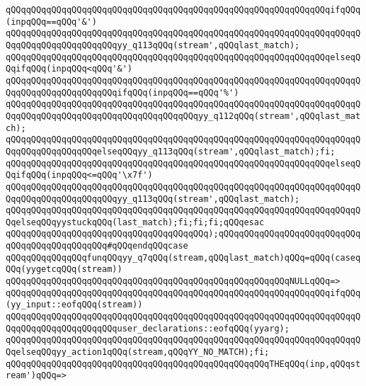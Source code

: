 \verb|qQQqqQQqqQQqqQQqqQQqqQQqqQQqqQQqqQQqqQQqqQQqqQQqqQQqqQQqqQQqqQQqifqQQq(inpqQQq==qQQq'&')|\newline
\verb|qQQqqQQqqQQqqQQqqQQqqQQqqQQqqQQqqQQqqQQqqQQqqQQqqQQqqQQqqQQqqQQqqQQqqQQqqQQqqQQqqQQqqQQqqQQqyy_q113qQQq(stream',qQQqlast_match);|\newline
\verb|qQQqqQQqqQQqqQQqqQQqqQQqqQQqqQQqqQQqqQQqqQQqqQQqqQQqqQQqqQQqqQQqelseqQQqifqQQq(inpqQQq<qQQq'&')|\newline
\verb|qQQqqQQqqQQqqQQqqQQqqQQqqQQqqQQqqQQqqQQqqQQqqQQqqQQqqQQqqQQqqQQqqQQqqQQqqQQqqQQqqQQqqQQqqQQqifqQQq(inpqQQq==qQQq'%')|\newline
\verb|qQQqqQQqqQQqqQQqqQQqqQQqqQQqqQQqqQQqqQQqqQQqqQQqqQQqqQQqqQQqqQQqqQQqqQQqqQQqqQQqqQQqqQQqqQQqqQQqqQQqqQQqqQQqyy_q112qQQq(stream',qQQqlast_match);|\newline
\verb|qQQqqQQqqQQqqQQqqQQqqQQqqQQqqQQqqQQqqQQqqQQqqQQqqQQqqQQqqQQqqQQqqQQqqQQqqQQqqQQqqQQqqQQqelseqQQqyy_q113qQQq(stream',qQQqlast_match);fi;|\newline
\verb|qQQqqQQqqQQqqQQqqQQqqQQqqQQqqQQqqQQqqQQqqQQqqQQqqQQqqQQqqQQqqQQqelseqQQqifqQQq(inpqQQq<=qQQq'\x7f')|\newline
\verb|qQQqqQQqqQQqqQQqqQQqqQQqqQQqqQQqqQQqqQQqqQQqqQQqqQQqqQQqqQQqqQQqqQQqqQQqqQQqqQQqqQQqqQQqqQQqyy_q113qQQq(stream',qQQqlast_match);|\newline
\verb|qQQqqQQqqQQqqQQqqQQqqQQqqQQqqQQqqQQqqQQqqQQqqQQqqQQqqQQqqQQqqQQqqQQqqQQqelseqQQqyystuckqQQq(last_match);fi;fi;fi;qQQqesac|\newline
\verb|qQQqqQQqqQQqqQQqqQQqqQQqqQQqqQQqqQQqqQQq);qQQqqQQqqQQqqQQqqQQqqQQqqQQqqQQqqQQqqQQqqQQqqQQq#qQQqendqQQqcase|\newline
\verb|qQQqqQQqqQQqqQQqfunqQQqyy_q7qQQq(stream,qQQqlast_match)qQQq=qQQq(caseqQQq(yygetcqQQq(stream))|\newline
\verb|qQQqqQQqqQQqqQQqqQQqqQQqqQQqqQQqqQQqqQQqqQQqqQQqqQQqqQQqNULLqQQq=>|\newline
\verb|qQQqqQQqqQQqqQQqqQQqqQQqqQQqqQQqqQQqqQQqqQQqqQQqqQQqqQQqqQQqqQQqifqQQq(yy_input::eofqQQq(stream))|\newline
\verb|qQQqqQQqqQQqqQQqqQQqqQQqqQQqqQQqqQQqqQQqqQQqqQQqqQQqqQQqqQQqqQQqqQQqqQQqqQQqqQQqqQQqqQQqqQQquser_declarations::eofqQQq(yyarg);|\newline
\verb|qQQqqQQqqQQqqQQqqQQqqQQqqQQqqQQqqQQqqQQqqQQqqQQqqQQqqQQqqQQqqQQqqQQqqQQqelseqQQqyy_action1qQQq(stream,qQQqYY_NO_MATCH);fi;|\newline
\verb|qQQqqQQqqQQqqQQqqQQqqQQqqQQqqQQqqQQqqQQqqQQqqQQqqQQqTHEqQQq(inp,qQQqstream')qQQq=>|\newline
